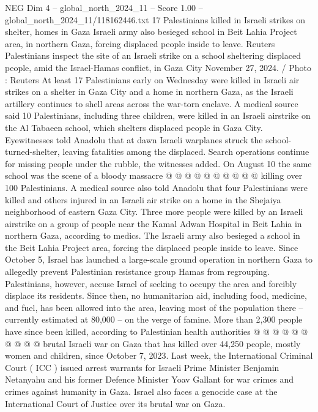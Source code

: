\begin{textsample}{NEG Dim 4 – global\_north\_2024\_11 – Score 1.00 – global\_north\_2024\_11/118162446.txt}  \label{ex:f4_neg_165}
17 Palestinians killed in Israeli strikes on shelter, homes in Gaza Israeli army also besieged school in Beit Lahia Project area, in northern Gaza, forcing displaced people inside to leave.
Reuters Palestinians inspect the site of an Israeli strike on a school sheltering displaced people, amid the Israel-Hamas conflict, in Gaza City November 27, 2024. / Photo : Reuters At least 17 Palestinians early on Wednesday were killed in Israeli air strikes on a shelter in Gaza City and a home in northern Gaza, as the Israeli artillery continues to shell areas across the war-torn enclave.
A medical source said 10 Palestinians, including three children, were killed in an Israeli airstrike on the Al Tabaeen school, which shelters displaced people in Gaza City.
Eyewitnesses told Anadolu that at dawn Israeli warplanes struck the school-turned-shelter, leaving fatalities among the displaced.
Search operations continue for missing people under the rubble, the witnesses added.
On August 10 the same school was the scene of a bloody massacre @ @ @ @ @ @ @ @ @ @ killing over 100 Palestinians.
A medical source also told Anadolu that four Palestinians were killed and others injured in an Israeli air strike on a home in the Shejaiya neighborhood of eastern Gaza City.
Three more people were killed by an Israeli airstrike on a group of people near the Kamal Adwan Hospital in Beit Lahia in northern Gaza, according to medics.
The Israeli army also besieged a school in the Beit Lahia Project area, forcing the displaced people inside to leave.
Since October 5, Israel has launched a large-scale ground operation in northern Gaza to allegedly prevent Palestinian resistance group Hamas from regrouping.
Palestinians, however, accuse Israel of seeking to occupy the area and forcibly displace its residents.
Since then, no humanitarian aid, including food, medicine, and fuel, has been allowed into the area, leaving most of the population there -- currently estimated at 80,000 -- on the verge of famine.
More than 2,300 people have since been killed, according to Palestinian health authorities @ @ @ @ @ @ @ @ @ @ brutal Israeli war on Gaza that has killed over 44,250 people, mostly women and children, since October 7, 2023.
Last week, the International Criminal Court ( ICC ) issued arrest warrants for Israeli Prime Minister Benjamin Netanyahu and his former Defence Minister Yoav Gallant for war crimes and crimes against humanity in Gaza.
Israel also faces a genocide case at the International Court of Justice over its brutal war on Gaza.

\end{textsample}
